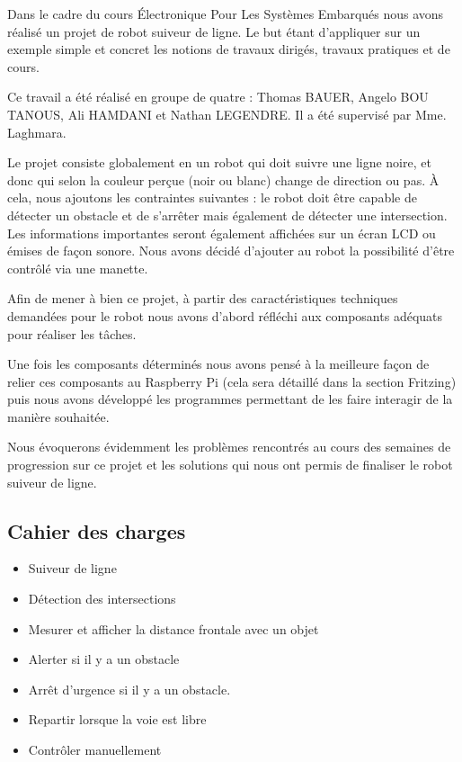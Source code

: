 Dans le cadre du cours Électronique Pour Les Systèmes Embarqués nous avons réalisé un projet de robot suiveur de ligne. Le but étant d'appliquer sur un exemple simple et concret les notions de travaux dirigés, travaux pratiques et de cours.

Ce travail a été réalisé en groupe de quatre : Thomas BAUER, Angelo BOU TANOUS, Ali HAMDANI et Nathan LEGENDRE. Il a été supervisé par Mme. Laghmara.

Le projet consiste globalement en un robot qui doit suivre une ligne noire, et donc qui selon la couleur perçue (noir ou blanc) change de direction ou pas. À cela, nous ajoutons les contraintes suivantes : le robot doit être capable de détecter un obstacle et de s'arrêter mais également de détecter une intersection. Les informations importantes seront également affichées sur un écran LCD ou émises de façon sonore. Nous avons décidé d'ajouter au robot la possibilité d'être contrôlé via une manette.

Afin de mener à bien ce projet, à partir des caractéristiques techniques demandées pour le robot nous avons d'abord réfléchi aux composants adéquats pour réaliser les tâches.

Une fois les composants déterminés nous avons pensé à la meilleure façon de relier ces composants au Raspberry Pi (cela sera détaillé dans la section Fritzing) puis nous avons développé les programmes permettant de les faire interagir de la manière souhaitée.

Nous évoquerons évidemment les problèmes rencontrés au cours des semaines de progression sur ce projet et les solutions qui nous ont permis de finaliser le robot suiveur de ligne.

\subsection*{Cahier des charges}
\begin{itemize}
    \item Suiveur de ligne
    \item Détection des intersections
    \item Mesurer et afficher la distance frontale avec un objet
    \item Alerter si il y a un obstacle
    \item Arrêt d'urgence si il y a un obstacle.
    \item Repartir lorsque la voie est libre
    \item Contrôler manuellement
\end{itemize}

\newpage